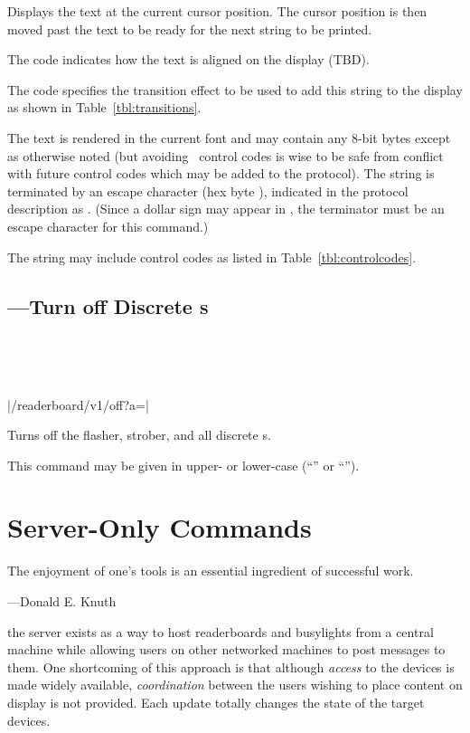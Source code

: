 Displays the text  at the current cursor position. The cursor position is
then moved past the text to be ready for the next string to be printed.

The  code indicates how the text is aligned on the display (TBD).

The  code specifies the transition effect to be used to add this string to the
display as shown in Table~\ref{tbl:transitions}.

The text is rendered in the current font and may contain any 8-bit bytes except as otherwise
noted (but avoiding \ascii\ control codes is wise to be safe from conflict with
future control codes which may be added to the protocol). The string is terminated by an
escape character (hex byte ), indicated in the protocol description as .
(Since a dollar sign may appear in , the terminator must be an escape
character for this command.)

The string may include control codes as listed in Table~\ref{tbl:controlcodes}.

\section{---Turn off Discrete \led s}
\begin{center}
\begin{bytefield}[endianness=little,bitwidth=0.11111\textwidth]{1}
	 \\
\end{bytefield}
\\
\begin{Coding}
	|/readerboard/v1/off?a=|
\end{Coding}
\end{center}

Turns off the flasher, strober, and all discrete \led s.

This command may be given in upper- or lower-case (``'' or ``'').

\chapter{Server-Only Commands}
\epigraph{The enjoyment of one’s tools is an essential ingredient of successful work.}{---Donald E. Knuth}
 the server exists as a way to host readerboards and busylights from a central machine
while allowing users on other networked machines to post messages to them. One shortcoming of this approach is that
although \emph{access} to the devices is made widely available, \emph{coordination} between the users wishing to
place content on display is not provided. Each update totally changes the state of the target devices.

